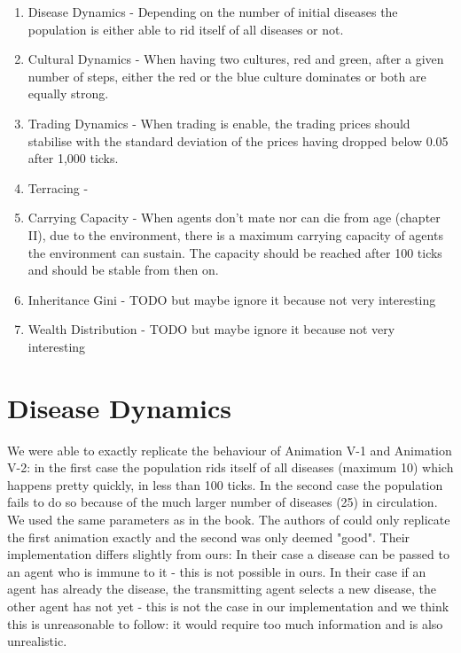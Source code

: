 \begin{enumerate}
	\item Disease Dynamics - Depending on the number of initial diseases the population is either able to rid itself of all diseases or not.
	
	\item Cultural Dynamics - When having two cultures, red and green, after a given number of steps, either the red or the blue culture dominates or both are equally strong.
	
	\item Trading Dynamics - When trading is enable, the trading prices should stabilise with the standard deviation of the prices having dropped below 0.05 after 1,000 ticks.
	
	\item Terracing -
		
	\item Carrying Capacity - When agents don't mate nor can die from age (chapter II), due to the environment, there is a maximum carrying capacity of agents the environment can sustain. The capacity should be reached after 100 ticks and should be stable from then on.
			
	\item Inheritance Gini - TODO but maybe ignore it because not very interesting

	\item Wealth Distribution - TODO but maybe ignore it because not very interesting
\end{enumerate}

\section{Disease Dynamics}
We were able to exactly replicate the behaviour of Animation V-1 and Animation V-2: in the first case the population rids itself of all diseases (maximum 10) which happens pretty quickly, in less than 100 ticks. In the second case the population fails to do so because of the much larger number of diseases (25) in circulation. We used the same parameters as in the book. 
The authors of \cite{weaver_replicating_2009} could only replicate the first animation exactly and the second was only deemed "good". Their implementation differs slightly from ours: In their case a disease can be passed to an agent who is immune to it - this is not possible in ours. In their case if an agent has already the disease, the transmitting agent selects a new disease, the other agent has not yet - this is not the case in our implementation and we think this is unreasonable to follow: it would require too much information and is also unrealistic.

